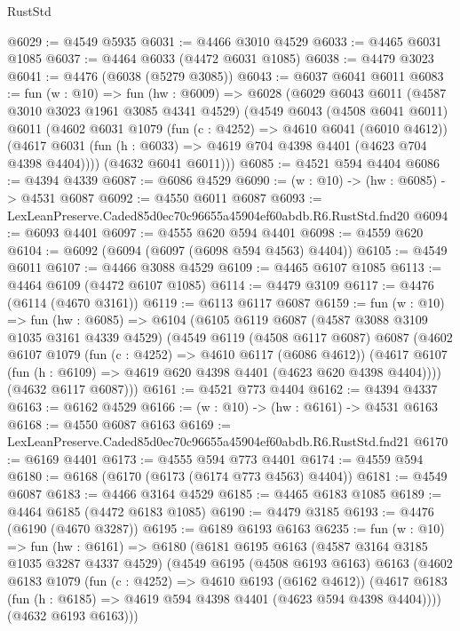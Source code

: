 \begin{lexlean}{RustStd}
\begin{coremodule}
@6029 := @4549 @5935
@6031 := @4466 @3010 @4529
@6033 := @4465 @6031 @1085
@6037 := @4464 @6033 (@4472 @6031 @1085)
@6038 := @4479 @3023
@6041 := @4476 (@6038 (@5279 @3085))
@6043 := @6037 @6041 @6011
@6083 := fun (w : @10) =>
  fun (hw : @6009) =>
  @6028
    (@6029
      @6043
      @6011
      (@4587 @3010 @3023 @1961 @3085 @4341 @4529)
      (@4549
        @6043
        (@4508 @6041 @6011)
        @6011
        (@4602
          @6031
          @1079
          (fun (c : @4252) => @4610 @6041 (@6010 @4612))
          (@4617 @6031 (fun (h : @6033) => @4619 @704 @4398 @4401 (@4623 @704 @4398 @4404))))
        (@4632 @6041 @6011)))
@6085 := @4521 @594 @4404
@6086 := @4394 @4339
@6087 := @6086 @4529
@6090 := (w : @10) -> (hw : @6085) -> @4531 @6087
@6092 := @4550 @6011 @6087
@6093 := LexLeanPreserve.Caded85d0ec70c96655a45904ef60abdb.R6.RustStd.fnd20
@6094 := @6093 @4401
@6097 := @4555 @620 @594 @4401
@6098 := @4559 @620
@6104 := @6092 (@6094 (@6097 (@6098 @594 @4563) @4404))
@6105 := @4549 @6011
@6107 := @4466 @3088 @4529
@6109 := @4465 @6107 @1085
@6113 := @4464 @6109 (@4472 @6107 @1085)
@6114 := @4479 @3109
@6117 := @4476 (@6114 (@4670 @3161))
@6119 := @6113 @6117 @6087
@6159 := fun (w : @10) =>
  fun (hw : @6085) =>
  @6104
    (@6105
      @6119
      @6087
      (@4587 @3088 @3109 @1035 @3161 @4339 @4529)
      (@4549
        @6119
        (@4508 @6117 @6087)
        @6087
        (@4602
          @6107
          @1079
          (fun (c : @4252) => @4610 @6117 (@6086 @4612))
          (@4617 @6107 (fun (h : @6109) => @4619 @620 @4398 @4401 (@4623 @620 @4398 @4404))))
        (@4632 @6117 @6087)))
@6161 := @4521 @773 @4404
@6162 := @4394 @4337
@6163 := @6162 @4529
@6166 := (w : @10) -> (hw : @6161) -> @4531 @6163
@6168 := @4550 @6087 @6163
@6169 := LexLeanPreserve.Caded85d0ec70c96655a45904ef60abdb.R6.RustStd.fnd21
@6170 := @6169 @4401
@6173 := @4555 @594 @773 @4401
@6174 := @4559 @594
@6180 := @6168 (@6170 (@6173 (@6174 @773 @4563) @4404))
@6181 := @4549 @6087
@6183 := @4466 @3164 @4529
@6185 := @4465 @6183 @1085
@6189 := @4464 @6185 (@4472 @6183 @1085)
@6190 := @4479 @3185
@6193 := @4476 (@6190 (@4670 @3287))
@6195 := @6189 @6193 @6163
@6235 := fun (w : @10) =>
  fun (hw : @6161) =>
  @6180
    (@6181
      @6195
      @6163
      (@4587 @3164 @3185 @1035 @3287 @4337 @4529)
      (@4549
        @6195
        (@4508 @6193 @6163)
        @6163
        (@4602
          @6183
          @1079
          (fun (c : @4252) => @4610 @6193 (@6162 @4612))
          (@4617 @6183 (fun (h : @6185) => @4619 @594 @4398 @4401 (@4623 @594 @4398 @4404))))
        (@4632 @6193 @6163)))

\end{coremodule}
\end{lexlean}
